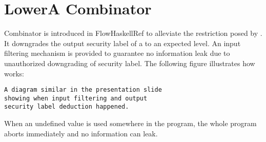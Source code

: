 
\section{LowerA Combinator}
\label{chap3:lower}


Combinator  is introduced in FlowHaskellRef to alleviate the restriction posed by . 
It downgrades the output security label of a  to an expected level. An input filtering 
mechanism is provided to guarantee no information leak due to unauthorized downgrading of security label.
The following figure illustrates how  works:
\begin{verbatim}
A diagram similar in the presentation slide 
showing when input filtering and output 
security label deduction happened.
\end{verbatim}
%
%
When an undefined value is used somewhere in the program, the whole program
aborts immediately and no information can leak.

